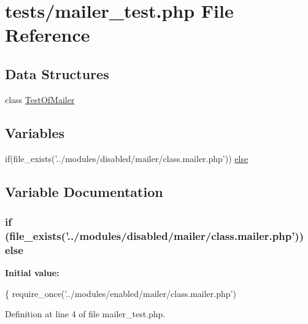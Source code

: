 \hypertarget{mailer__test_8php}{\section{tests/mailer\-\_\-test.php File Reference}
\label{mailer__test_8php}
}
\subsection*{Data Structures}
\begin{DoxyCompactItemize}
\item 
class \hyperlink{class_test_of_mailer}{Test\-Of\-Mailer}
\end{DoxyCompactItemize}
\subsection*{Variables}
\begin{DoxyCompactItemize}
\item 
if(file\-\_\-exists('../modules/disabled/mailer/class.\-mailer.\-php')) \hyperlink{mailer__test_8php_af9a8fd268532f6fe1652958abfe78c01}{else}
\end{DoxyCompactItemize}


\subsection{Variable Documentation}
\hypertarget{mailer__test_8php_af9a8fd268532f6fe1652958abfe78c01}{
\subsubsection[{else}]{\setlength{\rightskip}{0pt plus 5cm}if (file\-\_\-exists('../modules/disabled/mailer/class.\-mailer.\-php')) else}}\label{mailer__test_8php_af9a8fd268532f6fe1652958abfe78c01}
{\bfseries Initial value\-:}
\begin{DoxyCode}
\{
        require\_once(\textcolor{stringliteral}{'../modules/enabled/mailer/class.mailer.php'})
\end{DoxyCode}


Definition at line 4 of file mailer\-\_\-test.\-php.

